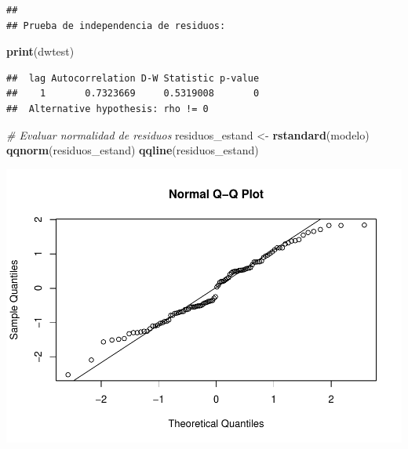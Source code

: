 \documentclass[
]{article}
\newenvironment{Shaded}{\begin{snugshade}}{\end{snugshade}}
\newcommand{\CommentTok}[1]{\textcolor[rgb]{0.56,0.35,0.01}{\textit{#1}}}
\newcommand{\DecValTok}[1]{\textcolor[rgb]{0.00,0.00,0.81}{#1}}
\newcommand{\FunctionTok}[1]{\textcolor[rgb]{0.13,0.29,0.53}{\textbf{#1}}}
\newcommand{\NormalTok}[1]{#1}
\newcommand{\OtherTok}[1]{\textcolor[rgb]{0.56,0.35,0.01}{#1}}
\newcommand{\SpecialCharTok}[1]{\textcolor[rgb]{0.81,0.36,0.00}{\textbf{#1}}}
\newcommand{\StringTok}[1]{\textcolor[rgb]{0.31,0.60,0.02}{#1}}
\begin{document}
\begin{verbatim}
## 
## Prueba de independencia de residuos:
\end{verbatim}

\begin{Shaded}
\begin{Highlighting}[]
\FunctionTok{print}\NormalTok{(dwtest)}
\end{Highlighting}
\end{Shaded}

\begin{verbatim}
##  lag Autocorrelation D-W Statistic p-value
##    1       0.7323669     0.5319008       0
##  Alternative hypothesis: rho != 0
\end{verbatim}

\begin{Shaded}
\begin{Highlighting}[]
\CommentTok{\# Evaluar normalidad de residuos}
\NormalTok{residuos\_estand }\OtherTok{\textless{}{-}} \FunctionTok{rstandard}\NormalTok{(modelo)}
\FunctionTok{qqnorm}\NormalTok{(residuos\_estand)}
\FunctionTok{qqline}\NormalTok{(residuos\_estand)}
\end{Highlighting}
\end{Shaded}

\includegraphics{ep10_files/figure-latex/unnamed-chunk-5-4.pdf}

\begin{Shaded}
\end{Shaded}
\end{document}
